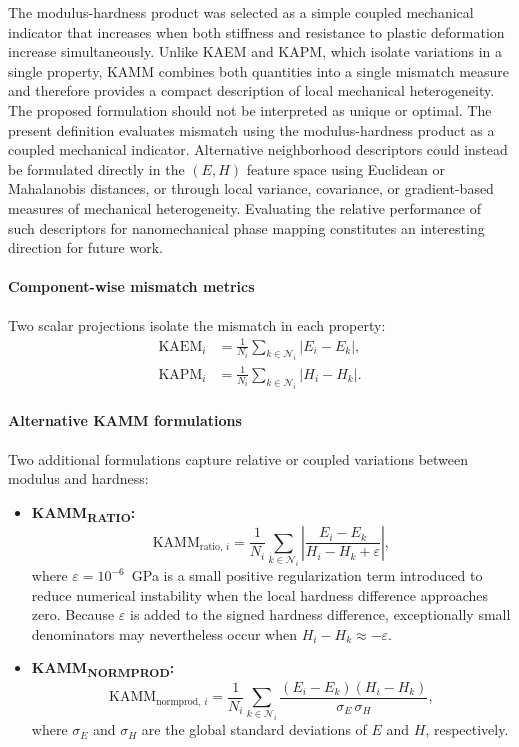 \documentclass[final,3p,times]{elsarticle}
\begin{document}
The modulus-hardness product was selected as a simple coupled mechanical indicator that increases when both stiffness and resistance to plastic deformation increase simultaneously. Unlike KAEM and KAPM, which isolate variations in a single property, KAMM combines both quantities into a single mismatch measure and therefore provides a compact description of local mechanical heterogeneity. The proposed formulation should not be interpreted as unique or optimal. The present definition evaluates mismatch using the modulus-hardness product as a coupled mechanical indicator. Alternative neighborhood descriptors could instead be formulated directly in the $(E,H)$ feature space using Euclidean or Mahalanobis distances, or through local variance, covariance, or gradient-based measures of mechanical heterogeneity. Evaluating the relative performance of such descriptors for nanomechanical phase mapping constitutes an interesting direction for future work.

\paragraph{Component-wise mismatch metrics}
Two scalar projections isolate the mismatch in each property:
\begin{align}
\label{eq:kaem}
\text{KAEM}_i &=
\frac{1}{N_i}
\sum_{k \in \mathcal{N}_i}
\lvert E_i - E_k \rvert,
\\[4pt]
\label{eq:kapm}
\text{KAPM}_i &=
\frac{1}{N_i}
\sum_{k \in \mathcal{N}_i}
\lvert H_i - H_k \rvert.
\end{align}

\paragraph{Alternative KAMM formulations}
Two additional formulations capture relative or coupled variations between modulus and hardness:
\begin{itemize}
    \item \textbf{KAMM\textsubscript{RATIO}:}
    \begin{equation}
    \text{KAMM}_{\mathrm{ratio},\,i}
    =
    \frac{1}{N_i}
    \sum_{k \in \mathcal{N}_i}
    \left\lvert
    \frac{E_i-E_k}{H_i-H_k+\varepsilon}
    \right\rvert,
    \end{equation}
    where $\varepsilon=10^{-6}$~GPa is a small positive regularization term introduced to reduce numerical instability when the local hardness difference approaches zero. Because $\varepsilon$ is added to the signed hardness difference, exceptionally small denominators may nevertheless occur when $H_i-H_k \approx -\varepsilon$.

    \item \textbf{KAMM\textsubscript{NORMPROD}:}
    \begin{equation}
    \text{KAMM}_{\mathrm{normprod},\,i}
    =
    \frac{1}{N_i}
    \sum_{k \in \mathcal{N}_i}
    \frac{(E_i-E_k)(H_i-H_k)}{\sigma_E\,\sigma_H},
    \end{equation}
    where $\sigma_E$ and $\sigma_H$ are the global standard deviations of $E$ and $H$, respectively.
\end{itemize}
\end{document}
